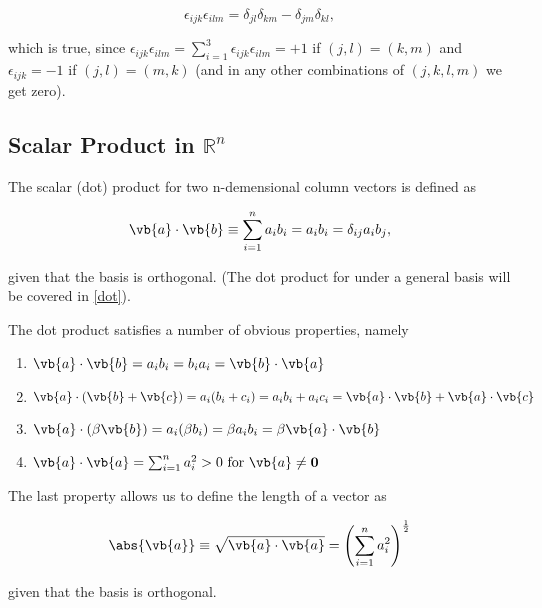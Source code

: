 \documentclass[a4paper,12pt]{report}
\begin{document}
\begin{equation}
    \epsilon _{ijk}\epsilon _{ilm} = \delta _{jl}\delta _{km} - \delta _{jm}\delta _{kl},      
\end{equation}

which is true, since \(\epsilon _{ijk}\epsilon _{ilm} = \sum_{i=1}^{3} \epsilon _{ijk}\epsilon _{ilm} = +1  \) if \((j,l) = (k,m)\) and \(\epsilon _{ijk} = -1 \) if \((j,l) = (m,k)\) (and in any other combinations of \((j,k,l,m)\) we get zero).

\subsection{Scalar Product in \(\mathbb{R}^{n} \) }

The scalar (dot) product for two n-demensional column vectors is defined as

\begin{equation}
    \vb{a} \cdot \vb{b} \equiv \sum_{i=1}^{n} a_{i} b_{i} = a_{i}b_{i} = \delta _{ij}a_{i}b_{j},    
\end{equation}

given that the basis is orthogonal. (The dot product for under a general basis will be covered in \cref{dot}).

The dot product satisfies a number of obvious properties, namely

\begin{enumerate}
    \item \(\vb{a} \cdot \vb{b} = a_{i} b_{i} = b_{i} a_{i} = \vb{b} \cdot \vb{a}  \)
    \item \(\vb{a} \cdot (\vb{b} + \vb{c} ) = a_{i} (b_{i} + c_{i}  ) = a_{i}b_{i} + a_{i}c_{i}   = \vb{a} \cdot \vb{b} + \vb{a} \cdot \vb{c}  \)
    \item \(\vb{a} \cdot (\beta \vb{b} ) = a_{i}(\beta b_{i} ) = \beta a_{i}b_{i} = \beta \vb{a} \cdot \vb{b}    \)
    \item \(\vb{a} \cdot \vb{a}  = \sum_{i=1}^{n} a_{i}^2 > 0 \text{ for } \vb{a} \neq \boldsymbol{0}  \)
\end{enumerate}

The last property allows us to define the length of a vector as 

\begin{equation}
    \abs{\vb{a} } \equiv \sqrt{\vb{a} \cdot \vb{a} } = \left( \sum_{i=1}^{n} a_{i}^2  \right) ^{\frac{1}{2} } 
\end{equation}

given that the basis is orthogonal.
\end{document}
